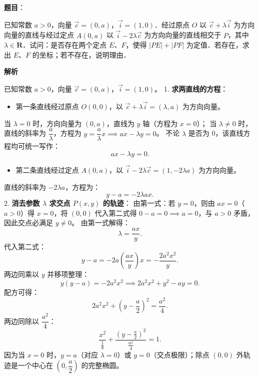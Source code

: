 \begin{answer}

\textbf{题目}：

已知常数 $a > 0$，向量 $\vec{c} = (0, a)$，$\vec{i} = (1, 0)$．经过原点 $O$ 以 $\vec{c} + \lambda\vec{i}$ 为方向向量的直线与经过定点 $A(0, a)$ 以 $\vec{i} - 2\lambda\vec{c}$ 为方向向量的直线相交于 $P$，其中 $\lambda \in \mathbf{R}$．试问：是否存在两个定点 $E$、$F$，使得 $|PE| + |PF|$ 为定值．若存在，求出 $E$、$F$ 的坐标；若不存在，说明理由．

\textbf{解析}

已知常数 $a > 0$，向量 $\vec{c} = (0, a)$，$\vec{i} = (1, 0)$。
1. \textbf{求两直线的方程}：
\begin{itemize}
\item 第一条直线经过原点 $O(0, 0)$，以 $\vec{c} + \lambda\vec{i} = (\lambda, a)$ 为方向向量。
\end{itemize}
     当 $\lambda = 0$ 时，方向向量为 $(0, a)$，直线为 $y$ 轴（方程为 $x = 0$）；
     当 $\lambda \ne 0$ 时，直线的斜率为 $\dfrac{a}{\lambda}$，方程为 $y = \dfrac{a}{\lambda} x \implies ax - \lambda y = 0$。
     不论 $\lambda$ 是否为 0，该直线方程均可统一写作：
\nopagebreak[4]
\[ax - \lambda y = 0.\]
\begin{itemize}
\item 第二条直线经过定点 $A(0, a)$，以 $\vec{i} - 2\lambda\vec{c} = (1, -2\lambda a)$ 为方向向量。
\end{itemize}
     直线的斜率为 $-2\lambda a$，方程为：
\nopagebreak[4]
\[y - a = -2\lambda a x.\]
2. \textbf{消去参数 $\lambda$ 求交点 $P(x, y)$ 的轨迹}：
   由第一式：若 $y = 0$，则由 $ax = 0$（$a > 0$）得 $x = 0$，将 $(0, 0)$ 代入第二式得 $0 - a = 0 \implies a = 0$，与 $a > 0$ 矛盾，因此交点必满足 $y \ne 0$。
   由第一式解得：
\nopagebreak[4]
\[\lambda = \frac{ax}{y}.\]
   代入第二式：
\nopagebreak[4]
\[y - a = -2a \left(\frac{ax}{y}\right) x = -\frac{2a^2 x^2}{y}.\]
   两边同乘以 $y$ 并移项整理：
\nopagebreak[4]
\[y(y - a) = -2a^2 x^2 \implies 2a^2 x^2 + y^2 - ay = 0.\]
   配方可得：
\nopagebreak[4]
\[2a^2 x^2 + \left(y - \frac{a}{2}\right)^2 = \frac{a^2}{4}.\]
   两边同除以 $\dfrac{a^2}{4}$：
\nopagebreak[4]
\[\frac{x^2}{\frac{1}{8}} + \frac{\left(y - \frac{a}{2}\right)^2}{\frac{a^2}{4}} = 1.\]
   因为当 $x = 0$ 时，$y = a$（对应 $\lambda = 0$）或 $y = 0$（交点极限）；除点 $(0, 0)$ 外轨迹是一个中心在 $\left(0, \dfrac{a}{2}\right)$ 的完整椭圆。

\end{answer}
